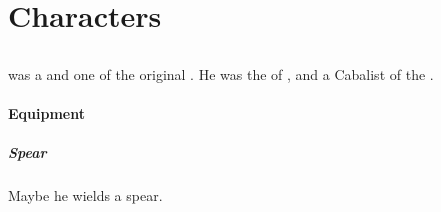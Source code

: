 
\part{\Resphan Characters}























\chapter{\CiriathSepher}















\section{\Azraid}
\index{\Azraid}
\index{\Gevural}
\Azraid was a \sathariah \resphan and one of the original . 
He was the  of , and a Cabalist of the . 









\subsection{Equipment}





\subsubsection{Spear}
Maybe he wields a spear. 

